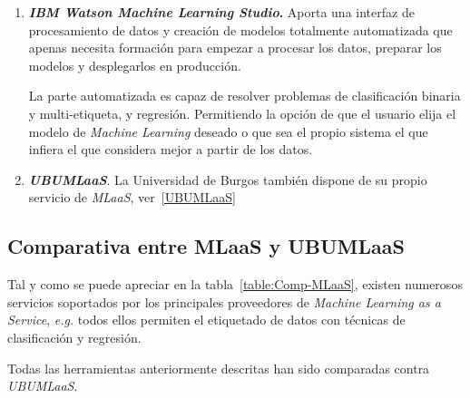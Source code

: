 \begin{enumerate}
\item \textbf{\textit{IBM Watson Machine Learning Studio}.}
Aporta una interfaz de procesamiento de datos y creación de modelos totalmente automatizada que apenas necesita formación para empezar a procesar los datos, preparar los modelos y desplegarlos en producción.

La parte automatizada es capaz de resolver problemas de clasificación binaria y multi-etiqueta, y regresión. Permitiendo la opción de que el usuario elija el modelo de \textit{Machine Learning} deseado o que sea el propio sistema el que infiera el que considera mejor a partir de los datos.

\item \textbf{\textit{UBUMLaaS}}. La Universidad de Burgos también dispone de su propio servicio de \textit{MLaaS}, ver~\ref{UBUMLaaS}

\end{enumerate}
\clearpage
\subsection{Comparativa entre MLaaS y UBUMLaaS}
Tal y como se puede apreciar en la tabla~\ref{table:Comp-MLaaS}, existen numerosos servicios soportados por los principales proveedores de \textit{Machine Learning as a Service}, \textit{\textit{e.g.}} todos ellos permiten el etiquetado de datos con técnicas de clasificación y regresión. 

Todas las herramientas anteriormente descritas han sido comparadas contra \textit{UBUMLaaS}. 

